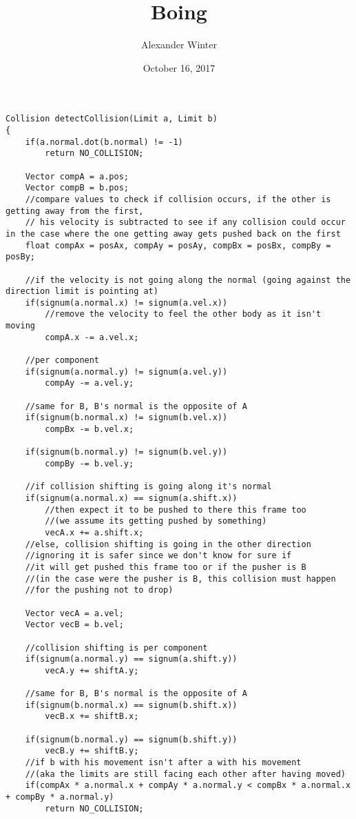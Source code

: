 \documentclass[12pt]{article}
\title{Boing}
\author{Alexander Winter}
\date{October 16, 2017}
\begin{document}
\maketitle
	
\newpage

\begin{lstlisting}
Collision detectCollision(Limit a, Limit b)
{
	if(a.normal.dot(b.normal) != -1)
		return NO_COLLISION;
	
	Vector compA = a.pos;
	Vector compB = b.pos;
	//compare values to check if collision occurs, if the other is getting away from the first,
	// his velocity is subtracted to see if any collision could occur in the case where the one getting away gets pushed back on the first
	float compAx = posAx, compAy = posAy, compBx = posBx, compBy = posBy;

	//if the velocity is not going along the normal (going against the direction limit is pointing at)
	if(signum(a.normal.x) != signum(a.vel.x))
		//remove the velocity to feel the other body as it isn't moving
		compA.x -= a.vel.x;

	//per component
	if(signum(a.normal.y) != signum(a.vel.y))
		compAy -= a.vel.y;

	//same for B, B's normal is the opposite of A
	if(signum(b.normal.x) != signum(b.vel.x))
		compBx -= b.vel.x;

	if(signum(b.normal.y) != signum(b.vel.y))
		compBy -= b.vel.y;

	//if collision shifting is going along it's normal
	if(signum(a.normal.x) == signum(a.shift.x))
		//then expect it to be pushed to there this frame too
		//(we assume its getting pushed by something)
		vecA.x += a.shift.x;
	//else, collision shifting is going in the other direction
	//ignoring it is safer since we don't know for sure if
	//it will get pushed this frame too or if the pusher is B
	//(in the case were the pusher is B, this collision must happen
	//for the pushing not to drop)
	
	Vector vecA = a.vel;
	Vector vecB = b.vel;
	
	//collision shifting is per component
	if(signum(a.normal.y) == signum(a.shift.y))
		vecA.y += shiftA.y;

	//same for B, B's normal is the opposite of A
	if(signum(b.normal.x) == signum(b.shift.x))
		vecB.x += shiftB.x;

	if(signum(b.normal.y) == signum(b.shift.y))
		vecB.y += shiftB.y;
	//if b with his movement isn't after a with his movement
	//(aka the limits are still facing each other after having moved)
	if(compAx * a.normal.x + compAy * a.normal.y < compBx * a.normal.x + compBy * a.normal.y)
		return NO_COLLISION;


\end{lstlisting}
\end{document}
